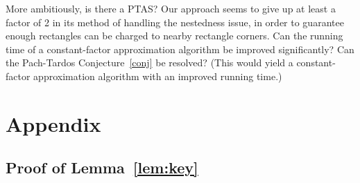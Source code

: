 \documentclass{article}
\begin{document}
More ambitiously, is there a PTAS? Our approach seems to give up at
least a factor of 2 in its method of handling the nestedness issue, in
order to guarantee enough rectangles can be charged to nearby
rectangle corners.  Can the running time of a constant-factor
approximation algorithm be improved significantly? Can the Pach-Tardos
Conjecture~\ref{conj} be resolved?  (This would yield a
constant-factor approximation algorithm with an improved running
time.)

\appendix

\section*{Appendix}

\subsection*{Proof of Lemma~\ref{lem:key}}
\end{document}
